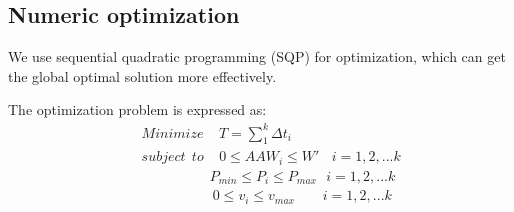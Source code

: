 \documentclass{mcmthesis}
\begin{document}
\subsection{Numeric optimization}
\par
We use sequential quadratic programming (SQP) for optimization, which can get the global optimal solution more effectively.
\par
The optimization problem is expressed as:
\begin{eqnarray*}
&& Minimize\ \ \ \ \ T=\sum_{1}^{k}\Delta t_i\\
&& subject\ \ to\ \ \ \ \ 0 \leq AAW_i \leq W'\ \ \ \ i=1,2,...k\\
&&\ \ \ \ \ \ \ \ \ \ \ \ \ \ \ \ \ \ \ \ \ \ P_{min} \leq P_i \leq P_{max}\ \ \ i=1,2,...k\\
&&\ \ \ \ \ \ \ \ \ \ \ \ \ \ \ \ \ \ \ \ \ \ \ 0 \leq v_i \leq v_{max}\ \ \ \ \ \ \ \ \ i=1,2,...k
\end{eqnarray*}


\end{document}
